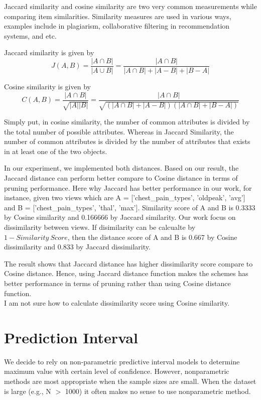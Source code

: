 \documentclass{article}
\begin{document}
Jaccard similarity and cosine similarity are two very common measurements while comparing item similarities. Similarity measures are used in various ways, examples include in plagiarism, collaborative filtering in recommendation systems, and etc. 

Jaccard similarity is given by $$J(A, B) = \frac{|A \cap B|}{|A \cup B|} = \frac{|A \cap B|}{|A \cap B| + |A - B| + |B - A|}$$

Cosine similarity is given by $$C(A, B) = \frac{|A \cap B|}{\sqrt{\left|A\right|\left|B\right|}} = \frac{|A \cap B|}{\sqrt{(\left|A\cap B\right| + |A - B|)(\left|A\cap B\right| + |B - A|)}}$$

Simply put, in cosine similarity, the number of common attributes is divided by the total number of possible attributes. Whereas in Jaccard Similarity, the number of common attributes is divided by the number of attributes that exists in at least one of the two objects. 

In our experiment, we implemented both distances. Based on our result, the Jaccard distance can perform better compare to Cosine distance in terms of pruning performance. Here why Jaccard has better performance in our work, for instance, given two views which are A = ['chest\_pain\_types', 'oldpeak', 'avg'] and B = ['chest\_pain\_types', 'thal', 'max']. Similarity score of A and B is 0.3333 by Cosine similarity and 0.166666 by Jaccard similarity. Our work focus on dissimilarity between views. If disimilarity can be calcualte by $1 - Similarity\ Score$, then the distance score of A and B is 0.667 by Cosine dissimilarity and 0.833 by Jaccard dissimilarity.

The result shows that Jaccard distance has higher dissimilarity score compare to Cosine distance. Hence, using Jaccard distance function makes the schemes has better performance in terms of pruning rather than using Cosine distance function.  
\\


 I am not sure how to calculate dissimilarity score using Cosine similarity. 


\section{Prediction Interval}


We decide to rely on non-parametric predictive interval models to determine maximum value with certain level of confidence. However, nonparametric methods are most appropriate when the sample sizes are small. When the dataset is large (e.g., N $>$ 1000) it often makes no sense to use nonparametric method. 
\end{document}
